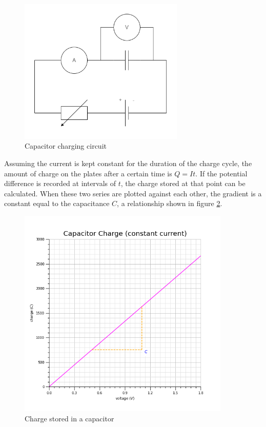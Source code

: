 \documentclass[10pt]{article}
\begin{document}
\begin{figure}[H]
\centering
\includegraphics[width=0.7\textwidth,keepaspectratio]{./images/capacitor_charge_circuit.png}
\caption{Capacitor charging circuit}
\label{img:capacitor_charge_circuit}
\end{figure}

Assuming the current is kept constant for the duration of the charge cycle, the amount of charge on the plates after a certain time is \(Q = It\). If the potential difference is recorded at intervals of \(t\), the charge stored at that point can be calculated. When these two series are plotted against each other, the gradient is a constant equal to the capacitance \(C\), a relationship shown in figure \ref{img:capacitor_charge_constant_current_diagram}.

\begin{figure}[H]
\centering
\includegraphics[width=0.9\textwidth,keepaspectratio]{./images/capacitor_charge_constant_current.png}
\caption{Charge stored in a capacitor}
\label{img:capacitor_charge_constant_current_diagram}
\end{figure}
\end{document}
